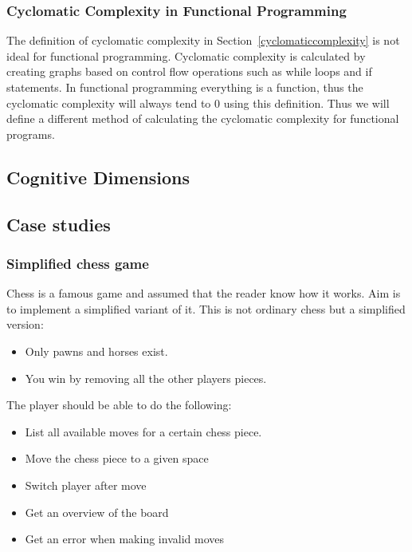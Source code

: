 \documentclass[12pt]{article}
\theoremstyle{definition}
\theoremstyle{theorem}
\begin{document}
\subsubsection{Cyclomatic Complexity in Functional Programming}

The definition of cyclomatic complexity in Section~\ref{cyclomaticcomplexity} is
not ideal for functional programming. Cyclomatic complexity is calculated by
creating graphs based on control flow operations such as while loops and if
statements. In functional programming everything is a function, thus the
cyclomatic complexity will always tend to 0 using this definition. Thus we will
define a different method of calculating the cyclomatic complexity for
functional programs.~\cite{bergklaas}

\subsection{Cognitive Dimensions}

\subsection{Case studies}

\subsubsection{Simplified chess game}

Chess is a famous game and assumed that the reader know how it works. Aim
is to implement a simplified variant of it. This is not ordinary chess but a
simplified version:

\begin{itemize} 
    \item Only pawns and horses exist.
    \item You win by removing all the other players pieces.
\end{itemize}

The player should be able to do the following:

\begin{itemize} 
    \item List all available moves for a certain chess piece. 
    \item Move the chess piece to a given space
    \item Switch player after move
    \item Get an overview of the board
    \item Get an error when making invalid moves
\end{itemize}
\end{document}
